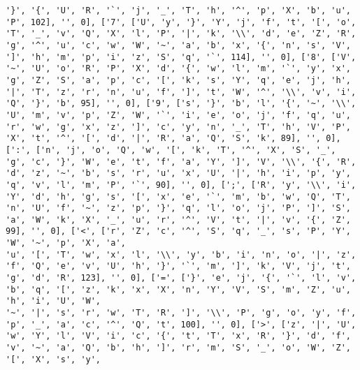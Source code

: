 \documentclass{article}
\begin{document}
\begin{verbatim}
'}', '{', 'U', 'R', '`', 'j', '_', 'T', 'h', '^', 'p', 'X', 'b', 'u', 'P', 102], '', 0], ['7', ['U', 'y', '}', 'Y', 'j', 'f', 't', '[', 'o', 'T', '_', 'v', 'Q', 'X', 'l', 'P', '|', 'k', '\\', 'd', 'e', 'Z', 'R', 'g', '^', 'u', 'c', 'w', 'W', '~', 'a', 'b', 'x', '{', 'n', 's', 'V', ']', 'h', 'm', 'p', 'i', 'z', 'S', 'q', '`', 114], '', 0], ['8', ['V', '~', 'U', 'o', 'R', 'P', 'X', 'd', '{', 'w', 'l', 'm', '`', 'y', 'x', 'g', 'Z', 'S', 'a', 'p', 'c', '[', 'k', 's', 'Y', 'q', 'e', 'j', 'h', '|', 'T', 'z', 'r', 'n', 'u', 'f', ']', 't', 'W', '^', '\\', 'v', 'i', 'Q', '}', 'b', 95], '', 0], ['9', ['s', '}', 'b', 'l', '{', '~', '\\', 'U', 'm', 'v', 'p', 'Z', 'W', '`', 'i', 'e', 'o', 'j', 'f', 'q', 'u', 'r', 'w', 'g', 'x', 'z', ']', 'c', 'y', 'n', '_', 'T', 'h', 'V', 'P', 'X', 't', '^', '[', 'd', '|', 'R', 'a', 'Q', 'S', 'k', 89], '', 0], [':', ['n', 'j', 'o', 'Q', 'w', '[', 'k', 'T', '^', 'X', 'S', '_', 'g', 'c', '}', 'W', 'e', 't', 'f', 'a', 'Y', ']', 'V', '\\', '{', 'R', 'd', 'z', '~', 'b', 's', 'r', 'u', 'x', 'U', '|', 'h', 'i', 'p', 'y', 'q', 'v', 'l', 'm', 'P', '`', 90], '', 0], [';', ['R', 'y', '\\', 'i', 'Y', 'd', 'h', 'g', 's', '[', 'x', 'e', '`', 'm', 'b', 'w', 'Q', 'T', 'n', 'U', 'f', '~', 'z', 'p', '}', 'q', 'l', 'o', 'j', 'P', ']', 'S', 'a', 'W', 'k', 'X', '_', 'u', 'r', '^', 'V', 't', '|', 'v', '{', 'Z', 99], '', 0], ['<', ['r', 'Z', 'c', '^', 'S', 'q', '_', 's', 'P', 'Y', 'W', '~', 'p', 'X', 'a', 
'u', '[', 'T', 'w', 'x', 'l', '\\', 'y', 'b', 'i', 'n', 'o', '|', 'z', 'f', 'Q', 'e', 'v', 'U', 'h', '}', '`', 'm', ']', 'k', 'V', 'j', 't', 'g', 'd', 'R', 123], '', 0], ['=', ['}', 'e', 'j', '{', '`', 'l', 'v', 'b', 'q', '[', 'z', 'k', 'x', 'X', 'n', 'Y', 'V', 'S', 'm', 'Z', 'u', 'h', 'i', 'U', 'W', 
'~', '|', 's', 'r', 'w', 'T', 'R', ']', '\\', 'P', 'g', 'o', 'y', 'f', 'p', '_', 'a', 'c', '^', 'Q', 't', 100], '', 0], ['>', ['z', '|', 'U', 'w', 'Y', 'l', 'V', 'i', 'c', '{', 't', 'T', 'x', 'R', '}', 'd', 'f', 'v', '~', 'a', 'Q', 'b', 'h', ']', 'r', 'm', 'S', '_', 'o', 'W', 'Z', '[', 'X', 's', 'y', 

\end{verbatim}
\end{document}
